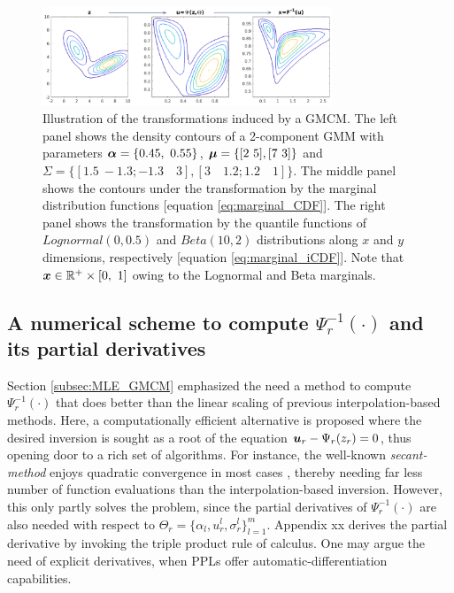 \documentclass{article}
\begin{document}
 

\begin{figure}[ht]
\centering
\includegraphics[width= 245pt]{figures/figure_gmcm_transformation}
\caption{Illustration of the transformations induced by a GMCM. The left panel shows the density contours of a 2-component GMM with parameters $\bs{\alpha} = \{0.45, \ 0.55\}$, $\boldsymbol{\mu} =\{[2 \ 5], [7 \ 3] \}$ and  $ \Sigma= \{[1.5 \  -1.3 ; -1.3 \quad 3 ],[3 \quad 1.2 ; 1.2 \quad 1] \}$. The middle panel shows the contours under the transformation by the marginal distribution functions [equation \eqref{eq:marginal_CDF}]. The right panel shows the transformation  by the quantile functions of $Lognormal(0,0.5)$ and $Beta(10,2)$ distributions along $x$ and $y$ dimensions, respectively [equation \eqref{eq:marginal_iCDF}]. Note that $\boldsymbol{x}\in \mathbb{R}^+\times [0,\ 1]$ owing to the Lognormal and Beta marginals.}

\label{fig:gmcm_transformation}
\end{figure}
\subsection{A numerical scheme to compute $\Psi^{-1}_r(\cdot)$ and its partial derivatives} 
Section \ref{subsec:MLE_GMCM} emphasized the need a method to compute $\Psi^{-1}_r(\cdot)$ that does better than the linear scaling of previous interpolation-based methods. Here, a computationally efficient alternative is proposed where the desired inversion is sought as a root of the equation $\boldsymbol{u}_r-\Psi_r(z_r)=0$, thus opening door to a rich set of algorithms. For instance, the well-known \emph{secant-method} enjoys quadratic convergence in most cases \citep{diez2003}, thereby needing far less number of function evaluations than the interpolation-based inversion. However, this only partly solves the problem, since the partial derivatives of $\Psi^{-1}_r(\cdot)$ are also needed with respect to $\Theta_r=\{\alpha_l,u_r^l,\sigma_r^l\}_{l=1}^m$. Appendix xx derives the partial derivative by invoking the triple product rule of calculus. One may argue the need of explicit derivatives, when PPLs offer automatic-differentiation capabilities. 
\end{document}
